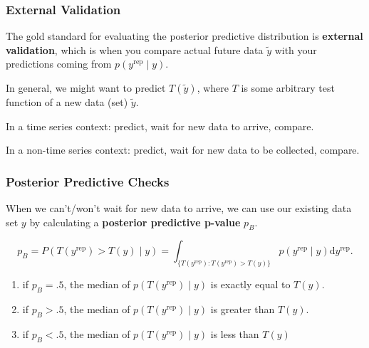 \documentclass{beamer}
\begin{document}
\begin{frame}
\frametitle{External Validation}

The gold standard for evaluating the posterior predictive distribution is {\bf external validation}, which is when you compare actual future data $\tilde{y}$ with your predictions coming from $p(y^{\text{rep}} \mid y)$.
\newline

In general, we might want to predict $T(\tilde{y})$, where $T$ is some arbitrary test function of a new data (set) $\tilde{y}$.
\newline

In a time series context: predict, wait for new data to arrive, compare.
\newline

In a non-time series context: predict, wait for new data to be collected, compare.

\end{frame}

\begin{frame}
\frametitle{Posterior Predictive Checks}

When we can't/won't wait for new data to arrive, we can use our existing data set $y$ by calculating a {\bf posterior predictive p-value} $p_B$. 
\newline

\[
p_B = P(T(y^{\text{rep}}) > T(y) \mid y) = \int_{\{T(y^{\text{rep}}) : T(y^{\text{rep}}) > T(y) \}} p(y^{\text{rep}} \mid y) \text{d}y^{\text{rep}}. 
\]

\begin{enumerate}
\item if $p_B = .5$, the median of $p(T(y^{\text{rep}}) \mid y)$ is exactly equal to $T(y)$.
\item if $p_B > .5$, the median of $p(T(y^{\text{rep}}) \mid y)$ is greater than  $T(y)$.
\item if $p_B < .5$, the median of $p(T(y^{\text{rep}}) \mid y)$ is less than  $T(y)$
\end{enumerate}



\end{frame}
\end{document}
